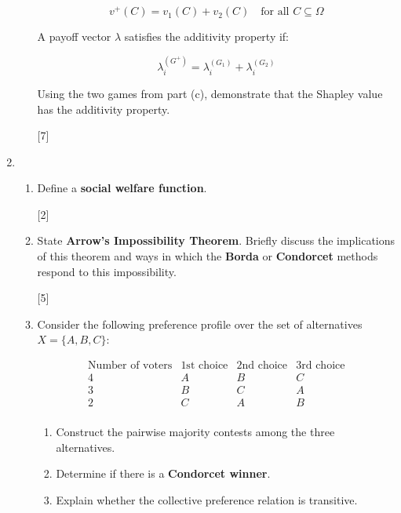 \documentclass[12pt,a4paper]{article}
\begin{document}
\begin{enumerate}
\begin{enumerate}
        \[
        v^+(C) = v_1(C) + v_2(C) \quad \text{for all } C \subseteq \Omega
        \]

        A payoff vector \(\lambda\) satisfies the additivity property if:

        \[
        \lambda_i^{(G^+)} = \lambda_i^{(G_1)} + \lambda_i^{(G_2)}
        \]

        Using the two games from part (c), demonstrate that the Shapley value has
        the additivity property.

        \hfill{[7]}
     
    \end{enumerate}

\newpage
\item

    \begin{enumerate}
        \item Define a \textbf{social welfare function}.

        \hfill{[2]}

        \item State \textbf{Arrow’s Impossibility Theorem}.
        Briefly discuss the implications of this theorem and ways in which the \textbf{Borda} or
        \textbf{Condorcet} methods respond to this impossibility.

        \hfill{[5]}

        \item Consider the following preference profile over the set of
        alternatives $X = \{A, B, C\}$:

        \[
        \begin{array}{c|ccc}
        \text{Number of voters} & \text{1st choice} & \text{2nd choice} & \text{3rd choice} \\
        \hline
        4 & A & B & C \\
        3 & B & C & A \\
        2 & C & A & B \\
        \end{array}
        \]

        \begin{enumerate}
            \item Construct the pairwise majority contests among the three
            alternatives.
            \item Determine if there is a \textbf{Condorcet winner}.
            \item Explain whether the collective preference relation is transitive.
        \end{enumerate}


\end{enumerate}
\end{enumerate}
\end{document}
